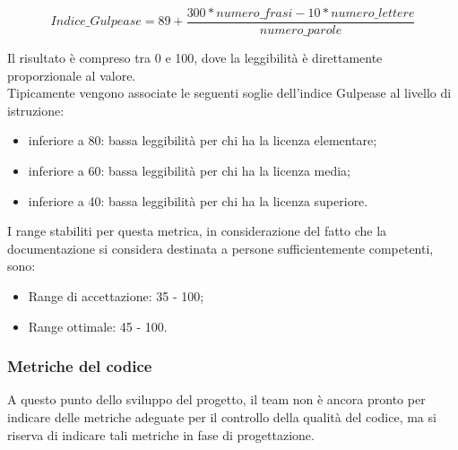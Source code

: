		\begin{equation}\label{Indice Gulpease}
		Indice\_Gulpease = 89+ \frac{300*numero\_frasi-10*numero\_lettere}{numero\_parole}
		\end{equation}
			
		Il risultato è compreso tra 0 e 100, dove la leggibilità è direttamente proporzionale al valore.\\
		Tipicamente vengono associate le seguenti soglie dell'indice Gulpease al livello di istruzione:
		\begin{itemize}
			\item inferiore a 80: bassa leggibilità per chi ha la licenza elementare;
			\item inferiore a 60: bassa leggibilità per chi ha la licenza media;
			\item inferiore a 40: bassa leggibilità per chi ha la licenza superiore.
		\end{itemize}
		
		I range stabiliti per questa metrica, in considerazione del fatto che la documentazione si considera destinata a persone sufficientemente competenti, sono:
		\begin{itemize}
			\item Range di accettazione: 35 - 100;
			\item Range ottimale: 45 - 100.
		\end{itemize}
	\subsubsection{Metriche del codice}
		A questo punto dello sviluppo del progetto, il team non è ancora pronto per indicare delle metriche adeguate per il controllo della qualità del codice, ma si riserva di indicare tali metriche in fase di progettazione.